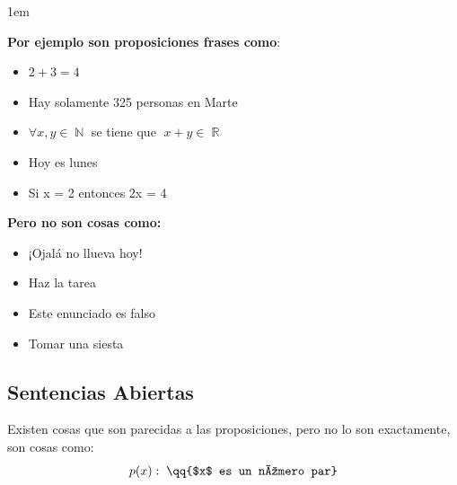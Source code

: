 \documentclass[12pt, fleqn]{report}                             %
\newenvironment{SmallIndentation}[1][0.75em]                    %
        {\begin{adjustwidth}{#1}{}\begin{footnotesize}}             %
        {\end{footnotesize}\end{adjustwidth}}                       %
\newcommand \Quote              {\qq}                           %
\theoremstyle{break}                                            %
\DeclareMathOperator \Naturals     {\mathbb{N}}                 %
\DeclareMathOperator \Reals        {\mathbb{R}}                 %
\begin{document}
                    \begin{multicols}{2}
                    \begin{SmallIndentation}[1em]
                        \textbf{Por ejemplo son proposiciones frases como}:
                        \begin{itemize}
                            \item $2 + 3 = 4$
                            \item Hay solamente 325 personas en Marte
                            \item $\forall x, y \in \Naturals$ se tiene que $\; x+y \in \Reals$
                            \item Hoy es lunes
                            \item Si x = 2 entonces 2x = 4
                        \end{itemize}

                        \textbf{Pero no son cosas como:}
                        \begin{itemize}
                            \item ¡Ojalá no llueva hoy!
                            \item Haz la tarea
                            \item Este enunciado es falso
                            \item Tomar una siesta
                        \end{itemize}
                    
                    \end{SmallIndentation}
                    \end{multicols}



            \clearpage
            \subsection{Sentencias Abiertas}
                Existen cosas que son parecidas a las proposiciones, pero no lo son exactamente,
                son cosas como:
                \begin{equation*}
                    p(x): \; \text{\Quote{$x$ es un número par}}  
                \end{equation*}
\end{document}

